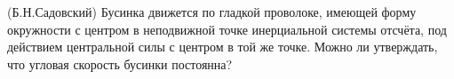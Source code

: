 (Б.Н.Садовский)
Бусинка движется по гладкой проволоке, имеющей форму окружности с
центром в неподвижной точке инерциальной системы отсчёта, под действием
центральной силы с центром в той же точке. Можно ли утверждать,
что угловая скорость бусинки постоянна?
